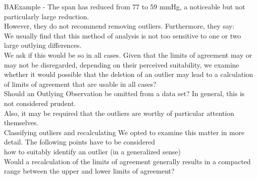 \documentclass[12pt, a4paper]{report}
\theoremstyle{plain}
\theoremstyle{definition}
\theoremstyle{remark}
\begin{document}
BAExample -	The span has reduced from 77 to 59 mmHg, a noticeable but not
particularly large reduction.
\\
However, they do not recommend removing outliers. Furthermore,
they say:
\\
We usually find that this method of analysis is not too sensitive
to one or two large outlying differences.
\\
We ask if this would be so in all cases. Given that the limits of
agreement may or may not be disregarded, depending on their
perceived suitability, we examine whether it would possible that
the deletion of an outlier may lead to a calculation of limits of
agreement that are usable in all cases?
\\
Should an Outlying Observation be omitted from a data set? In
general, this is not considered prudent.
\\
Also, it may be required that the outliers are worthy of
particular attention themselves.
\\
Classifying outliers and recalculating We opted to examine this
matter in more detail. The following points have to be considered
\\how to suitably identify an outlier (in a generalized sense)
\\Would a recalculation of the limits of agreement generally
results in  a compacted range between the upper and lower limits
of agreement?



	


\end{document}
